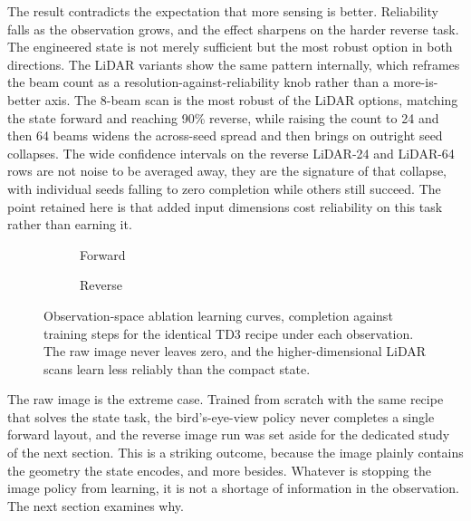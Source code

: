 

The result contradicts the expectation that more sensing is better. Reliability falls as the observation grows, and the effect sharpens on the harder reverse task. The engineered state is not merely sufficient but the most robust option in both directions. The LiDAR variants show the same pattern internally, which reframes the beam count as a resolution-against-reliability knob rather than a more-is-better axis. The 8-beam scan is the most robust of the LiDAR options, matching the state forward and reaching 90\% reverse, while raising the count to 24 and then 64 beams widens the across-seed spread and then brings on outright seed collapses. The wide confidence intervals on the reverse LiDAR-24 and LiDAR-64 rows are not noise to be averaged away, they are the signature of that collapse, with individual seeds falling to zero completion while others still succeed. The point retained here is that added input dimensions cost reliability on this task rather than earning it.

\begin{figure}[H]
    \centering
    \begin{subfigure}{0.49\textwidth}
        \centering
        \caption{Forward}
        \label{fig:forward_obs_ablation}
    \end{subfigure}
    \hfill
    \begin{subfigure}{0.49\textwidth}
        \centering
        \caption{Reverse}
        \label{fig:reverse_obs_ablation}
    \end{subfigure}
    \caption{Observation-space ablation learning curves, completion against training steps for the identical TD3 recipe under each observation. The raw image never leaves zero, and the higher-dimensional LiDAR scans learn less reliably than the compact state.}
    \label{fig:obs_ablation}
\end{figure}

The raw image is the extreme case. Trained from scratch with the same recipe that solves the state task, the bird's-eye-view policy never completes a single forward layout, and the reverse image run was set aside for the dedicated study of the next section. This is a striking outcome, because the image plainly contains the geometry the state encodes, and more besides. Whatever is stopping the image policy from learning, it is not a shortage of information in the observation. The next section examines why.

